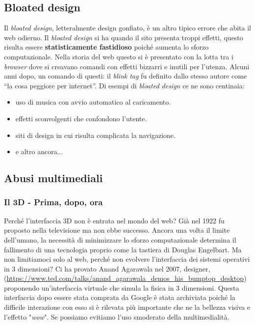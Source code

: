 		\subsection{Bloated design}
			Il \emph{bloated design}, letteralmente design gonfiato, è un altro tipico errore che abita il web odierno. Il \emph{bloated design} si ha quando il sito presenta troppi effetti, questo risulta essere \textbf{statisticamente fastidioso} poiché aumenta lo sforzo computazionale.
			Nella storia del web questo si è presentato con la lotta tra i \emph{browser} dove si creavano comandi con effetti bizzarri e inutili per l'utenza. Alcuni anni dopo, un comando di questi: il \emph{blink tag} fu definito dallo stesso autore come ``la cosa peggiore per internet''.
			Di esempi di \emph{bloated design} ce ne sono centinaia:
			\begin{itemize}
				\item uso di musica con avvio automatico al caricamento.
				\item effetti sconvolgenti che confondono l'utente.
				\item siti di design in cui risulta complicata la navigazione.
				\item e altro ancora...
			\end{itemize}
		
		\subsection{Abusi multimediali}
			
			\subsubsection{Il 3D - Prima, dopo, ora}
				Perché l'interfaccia 3D non è entrata nel mondo del web? Già nel 1922 fu proposto nella televisione ma non ebbe successo. Ancora una volta il limite dell'umano, la necessità di minimizzare lo sforzo computazionale determina il fallimento di una tecnologia proprio come la tastiera di Douglas Engelbart. 
				Ma non limitiamoci solo al web, perché non evolvere l'interfaccia dei sistemi operativi in 3 dimensioni? Ci ha provato Anand Agarawala nel 2007, designer, (\url{https://www.ted.com/talks/anand_agarawala_demos_his_bumptop_desktop}) proponendo un'interfaccia virtuale che simula la fisica in 3 dimensioni. Questa interfaccia dopo essere stata comprata da Google è stata archiviata poiché la difficile interazione con esso si è rilevata più importante che ne la bellezza visiva e l'effetto "\emph{wow}".
				Se possiamo evitiamo l'uso smoderato della multimedialità. 
				
